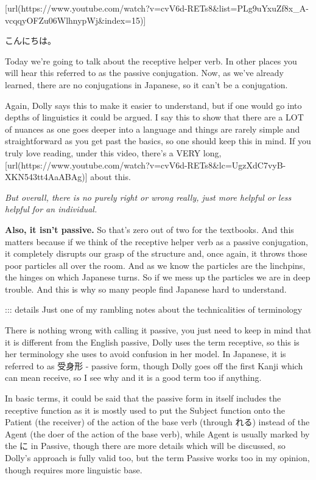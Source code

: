 \startsectionlevel[title={{\bf 13. Passive Conjugation / Receptive Helper Verb}},reference={passive-conjugation-receptive-helper-verb}]

[url(https://www.youtube.com/watch?v=cvV6d-RETs8&list=PLg9uYxuZf8x_A-vcqqyOFZu06WlhnypWj&index=15)]

こんにちは。

Today we're going to talk about the receptive helper verb. In other places you will hear this referred to as the passive conjugation. Now, as we've already learned, there are no conjugations in Japanese, so it can't be a conjugation.

Again, Dolly says this to make it easier to understand, but if one would go into depths of linguistics it could be argued. I say this to show that there are a LOT of nuances as one goes deeper into a language and things are rarely simple and straightforward as you get past the basics, so one should keep this in mind. If you truly love reading, under this video, there's a VERY long, [url(https://www.youtube.com/watch?v=cvV6d-RETs8&lc=UgzXdC7vyB-XKN543tt4AaABAg)] about this.

{\em But overall, there is no purely right or wrong really, just more helpful or less helpful for an individual.}

{\bf Also, it isn't passive.} So that's zero out of two for the textbooks. And this matters because if we think of the receptive helper verb as a passive conjugation, it completely disrupts our grasp of the structure and, once again, it throws those poor particles all over the room. And as we know the particles are the linchpins, the hinges on which Japanese turns. So if we mess up the particles we are in deep trouble. And this is why so many people find Japanese hard to understand.

::: details Just one of my rambling notes about the technicalities of terminology

There is nothing wrong with calling it passive, you just need to keep in mind that it is different from the English passive, Dolly uses the term receptive, so this is her terminology she uses to avoid confusion in her model. In Japanese, it is referred to as 受身形 - passive form, though Dolly goes off the first Kanji which can mean receive, so I see why and it is a good term too if anything.

In basic terms, it could be said that the passive form in itself includes the receptive function as it is mostly used to put the Subject function onto the Patient (the receiver) of the action of the base verb (through れる) instead of the Agent (the doer of the action of the base verb), while Agent is usually marked by the に in Passive, though there are more details which will be discussed, so Dolly's approach is fully valid too, but the term Passive works too in my opinion, though requires more linguistic base.

